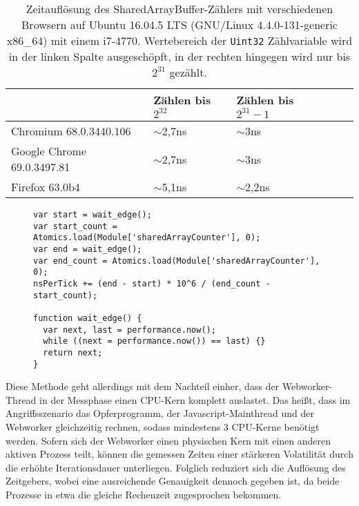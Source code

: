 \label{tbl:times_res}
\begin{table}[h]
\caption{Zeitauflösung des SharedArrayBuffer-Zählers mit verschiedenen Browsern auf Ubuntu 16.04.5 LTS (GNU/Linux 4.4.0-131-generic x86_64) mit einem i7-4770. Wertebereich der \lstinline{Uint32} Zählvariable wird in der linken Spalte ausgeschöpft, in der rechten hingegen wird nur bis $2^{31}$ gezählt.}
\begin{tabular}{lllll}
\toprule
                           & Zählen bis $2^{32}$ & Zählen bis $2^{31}-1$ &  &  \\
                           \midrule
Chromium 68.0.3440.106     & $\sim$2,7ns                      & $\sim$3ns                        &  &  \\
Google Chrome 69.0.3497.81 & $\sim$2,7ns                      & $\sim$3ns                        &  &  \\
Firefox 63.0b4             & $\sim$5,1ns                      & $\sim$2,2ns                      &  &  \\
\bottomrule
\end{tabular}
\end{table}


\begin{figure}[h]
\begin{lstlisting}[caption=main.js: Code welcher die Timerauflösung bestimmt,label=alg_list:getResolutionNS]
var start = wait_edge();
var start_count = Atomics.load(Module['sharedArrayCounter'], 0);
var end = wait_edge();
var end_count = Atomics.load(Module['sharedArrayCounter'], 0);
nsPerTick += (end - start) * 10^6 / (end_count - start_count);

function wait_edge() {
  var next, last = performance.now();
  while ((next = performance.now()) == last) {}
  return next;
}
\end{lstlisting}
\end{figure}

Diese Methode geht allerdings mit dem Nachteil einher, dass der Webworker-Thread in der Messphase einen CPU-Kern komplett auslastet. Das heißt, dass im Angriffsszenario das Opferprogramm, der Javascript-Mainthread und der Webworker gleichzeitig rechnen, sodass mindestens 3 CPU-Kerne benötigt werden. 
Sofern sich der Webworker einen physischen Kern mit einen anderen aktiven Prozess teilt, können die gemessen Zeiten einer stärkeren Volatilität durch die erhöhte Iterationsdauer unterliegen.
Folglich reduziert sich die Auflösung des Zeitgebers, wobei eine ausreichende Genauigkeit dennoch gegeben ist, da beide Prozesse in etwa die gleiche Rechenzeit zugesprochen bekommen.

